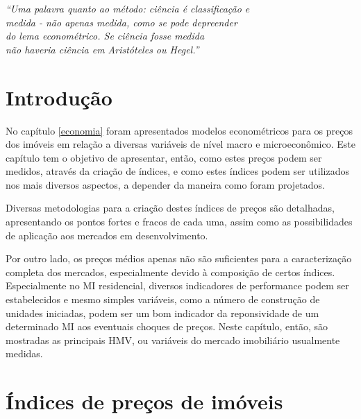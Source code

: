 \documentclass[
	12pt,				%
	oneside,			%
	a4paper,			%
	chapter=TITLE,		%
	section=TITLE,		%
	english,			%
	brazil				%
	]{abntex2}
\begin{document}
\begin{refsection}
\begin{epigrafe}
    \vspace*{\fill}
    \begin{flushright}
    \textit{``Uma palavra quanto ao método: ciência é classificação e\\
    medida - não apenas medida, como se pode depreender\\ 
    do lema econométrico. Se ciência fosse medida\\
    não haveria ciência em Aristóteles ou Hegel.''\\
    \cite[p.~204]{rangel1956}}
    \end{flushright}
\end{epigrafe}
\hypertarget{introduuxe7uxe3o-3}{%
\section{Introdução}\label{introduuxe7uxe3o-3}}

No capítulo \ref{economia} foram apresentados modelos econométricos para os
preços dos imóveis em relação a diversas variáveis de nível macro e
microeconômico. Este capítulo tem o objetivo de apresentar, então, como estes
preços podem ser medidos, através da criação de índices, e como estes índices
podem ser utilizados nos mais diversos aspectos, a depender da maneira como
foram projetados.

Diversas metodologias para a criação destes índices de preços são detalhadas,
apresentando os pontos fortes e fracos de cada uma, assim como as possibilidades
de aplicação aos mercados em desenvolvimento.

Por outro lado, os preços médios apenas não são suficientes para a
caracterização completa dos mercados, especialmente devido à composição de
certos índices. Especialmente no \gls{MI} residencial, diversos indicadores de
performance podem ser estabelecidos e mesmo simples variáveis, como a número de
construção de unidades iniciadas, podem ser um bom indicador da reponsividade de
um determinado \gls{MI} aos eventuais choques de preços. Neste capítulo, então,
são mostradas as principais \gls{HMV}, ou variáveis do mercado imobiliário
usualmente medidas.

\hypertarget{uxedndices-de-preuxe7os-de-imuxf3veis}{%
\section{Índices de preços de imóveis}\label{uxedndices-de-preuxe7os-de-imuxf3veis}}


\end{refsection}
\end{document}
